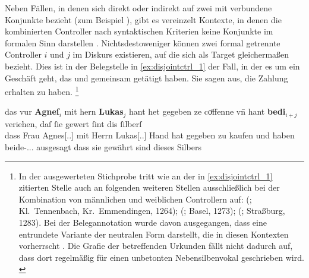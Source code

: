 Neben Fällen, in denen sich  direkt oder indirekt auf zwei mit
 verbundene Konjunkte bezieht (zum Beispiel ), gibt es vereinzelt Kontexte, in denen die
kombinierten Controller nach syntaktischen Kriterien keine Konjunkte im
formalen Sinn darstellen \autocite[vgl.~auch][247--248]{askedal1973}.
Nichtsdestoweniger können zwei formal getrennte Controller $i$ und $j$ im
Diskurs existieren, auf die sich   als Target
gleichermaßen bezieht. Dies ist in der Belegstelle in \cref{ex:disjointctrl_1}
der Fall, in der es um ein Geschäft geht, das  und 
gemeinsam getätigt haben. Sie sagen   aus, die
Zahlung erhalten zu haben.%
%
	\footnote{In der ausgewerteten Stichprobe tritt  wie an der in
		\cref{ex:disjointctrl_1} zitierten Stelle auch an folgenden weiteren
		Stellen ausschließlich bei der Kombination von männlichen und
		weiblichen Controllern auf: 
		(\cite{cao1}; Kl.~Tennenbach, Kr.~Emmendingen, 1264);
		 (\cite{cao1}; Basel, 1273);
		 (\cite{cao5}; Straßburg, 1283). Bei
		der Belegannotation wurde davon ausgegangen, dass  eine
		entrundete Variante der neutralen Form  darstellt, die in
		diesen Kontexten vorherrscht \autocites(siehe auch
		\cref{sec:caoalemschwa})[vgl.][41]{paul2007}. Die Grafie der
		betreffenden Urkunden fällt nicht dadurch auf, dass dort regelmäßig
		 für einen unbetonten Nebensilbenvokal geschrieben wird.
		\label{fn:caoalemschwa}}

\begin{exe}
\ex\label{ex:disjointctrl_1}
	\setlength{\glossglue}{6pt plus 2pt minus 2pt}
	\gll das vur \textbf{Agneſ}$_i$ mit hern \textbf{Lukas}$_j$ hant \textelp{}
			het gegeben ze coͧffenne \textelp{} vn̄ hant \textbf{bedi}$_{i+j}$
			veriehen, daſ ſie gewert ſint dis ſilberſ \\
		dass Frau Agnes[\Nom.\Sg.\FemF] mit Herrn Lukas[\Dat.\Sg.\MascM] Hand
			{} hat gegeben zu kaufen {} und haben beide-\Nom.\Pl.\N\subMF.\St{}
			ausgesagt dass sie gewährt sind dieses Silbers \\
	\begin{taggedline}{\parencites(Straßburg, 1281)[\pno~N~202, 156.11--16]{cao5}}
		\trans {}
	\end{taggedline}
\end{exe}%

